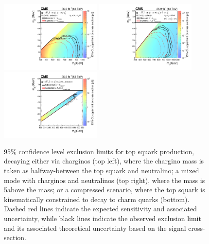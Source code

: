 \begin{figure}
	\centering
	\includegraphics[width=0.45\textwidth]{results/figs/interpretations/T2bW_35p9ifb_Moriond2017_Mar07_XSEC}
	\includegraphics[width=0.45\textwidth]{results/figs/interpretations/T2bt_35p9ifb_Moriond2017_Mar07_XSEC}
	\includegraphics[width=0.45\textwidth]{results/figs/interpretations/T2cc_35p9ifb_Moriond2017_Mar07_XSEC}
	\caption{95\% confidence level exclusion limits for top squark production, decaying either via charginos (top left), where the chargino mass is taken as halfway-between the top squark and neutralino; a mixed mode with charginos and neutralinos (top right), where the \chipm mass is 5\GeV above the \lsp mass; or a compressed scenario, where the top squark is kinematically constrained to decay to charm quarks (bottom).  Dashed red lines indicate the expected sensitivity and associated uncertainty, while black lines indicate the observed exclusion limit and its associated theoretical uncertainty based on the signal cross-section.}
	\label{fig:limitsStop}
\end{figure}

